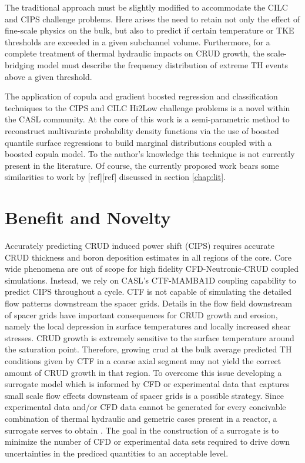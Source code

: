 The traditional approach must be slightly modified to accommodate the CILC and
CIPS challenge problems.  Here arises the need to retain not only the effect of
fine-scale physics on the bulk, but also to predict if certain
temperature or TKE thresholds are exceeded in a given subchannel
volume.  Furthermore, for a complete treatment of thermal hydraulic impacts on
CRUD growth, the scale-bridging model must describe the frequency
distribution of extreme TH events above a given threshold.

The application of copula and gradient boosted regression and classification
techniques to the CIPS and CILC Hi2Low challenge problems is a novel within the CASL community.
At the core of this work is a semi-parametric method to reconstruct multivariate probability density functions via the use of boosted quantile surface regressions to build marginal distributions coupled with a boosted copula model.  To the author's knowledge this technique is not currently present in the literature.
Of course, the currently proposed work bears some similarities to work by [ref][ref] discussed in section \autoref{chap:lit}.

\section{Benefit and Novelty}

Accurately predicting CRUD induced power shift (CIPS) requires accurate CRUD
thickness and boron deposition estimates in all regions of the core.  Core wide
phenomena are out of scope for high fidelity CFD-Neutronic-CRUD coupled
simulations.  Instead, we rely on CASL's CTF-MAMBA1D coupling capability to
predict CIPS throughout a cycle.  CTF is not capable of simulating the detailed
flow patterns downstream the spacer grids.  Details in the flow field
downstream of spacer grids have important consequences for CRUD growth and
erosion, namely the local depression in surface temperatures and locally
increased shear stresses.  CRUD growth is extremely sensitive to the surface
temperature around the saturation point.  Therefore, growing crud at the bulk
average predicted TH conditions given by CTF in a coarse axial segment may not
yield the correct amount of CRUD growth in that region.  To overcome this issue
developing a surrogate model which is informed by CFD or experimental data that
captures small scale flow effects downsteam of spacer grids is a possible strategy.
Since experimental data and/or CFD data cannot be generated for every concivable
combination of thermal hydraulic and gemetric cases present in a reactor, a surrogate
serves to obtain .  The goal in the construction of a surrogate is to minimize the
number of CFD or experimental data sets required to drive down uncertainties in
the prediced quantities to an acceptable level.

